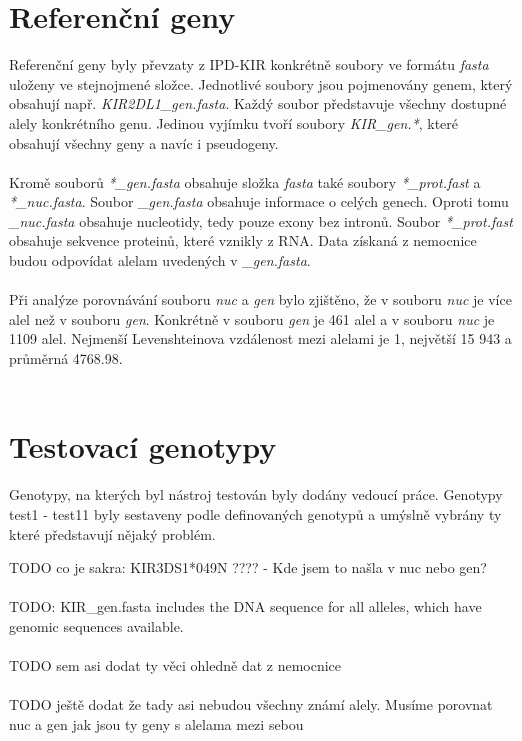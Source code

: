 \documentclass[czech,DP]{thesiskiv}
\numberwithin{equation}{section}
\begin{document}
\section{Referenční geny}
Referenční geny byly převzaty z IPD-KIR \cite{imgt_hla_database} konkrétně soubory ve formátu \textit{fasta} uloženy ve stejnojmené složce. Jednotlivé soubory jsou pojmenovány genem, který obsahují např. \textit{KIR2DL1\_gen.fasta}. Každý soubor představuje všechny dostupné alely konkrétního genu. Jedinou vyjímku tvoří soubory \textit{KIR\_gen.*}, které obsahují všechny geny a navíc i pseudogeny. 
\\
\\
Kromě souborů \textit{*\_gen.fasta} obsahuje složka \textit{fasta} také soubory \textit{*\_prot.fast} a \textit{*\_nuc.fasta}. Soubor \textit{\_gen.fasta} obsahuje informace o celých genech. Oproti tomu \textit{\_nuc.fasta} obsahuje nucleotidy, tedy pouze exony bez intronů. Soubor \textit{*\_prot.fast} obsahuje sekvence proteinů, které vznikly z RNA. Data získaná z nemocnice budou odpovídat alelam uvedených v \textit{\_gen.fasta}. 
\\
\\
Při analýze porovnávání souboru \textit{nuc} a \textit{gen} bylo zjištěno, že v souboru \textit{nuc} je více alel než v souboru \textit{gen}. Konkrétně v souboru \textit{gen} je 461 alel a v souboru \textit{nuc} je 1109 alel. Nejmenší Levenshteinova vzdálenost mezi alelami je 1, největší 15 943 a průměrná 4768.98.
\\
\\
\section{Testovací genotypy}
Genotypy, na kterých byl nástroj testován byly dodány vedoucí práce. Genotypy test1 - test11 byly sestaveny podle definovaných genotypů a umýslně vybrány ty které představují nějaký problém.


TODO co je sakra:  KIR3DS1*049N ???? - Kde jsem to našla v nuc nebo gen?
\\
\\
TODO: KIR\_gen.fasta  includes the DNA sequence for all alleles, which have genomic sequences available.
\\
\\
TODO sem asi dodat ty věci ohledně dat z nemocnice
\\
\\
TODO ještě dodat že tady asi nebudou všechny známí alely.
Musíme porovnat nuc a gen jak jsou ty geny s alelama mezi sebou
\end{document}

